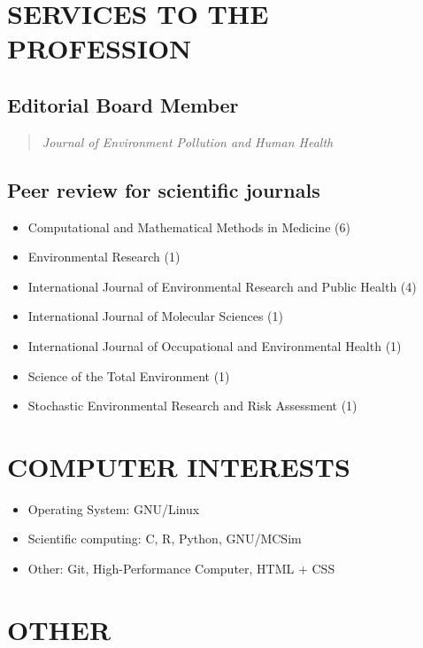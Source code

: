 \documentclass[10pt,]{article}
\providecommand{\tightlist}{%
  \setlength{\itemsep}{0pt}\setlength{\parskip}{0pt}}
\begin{document}
\section{SERVICES TO THE PROFESSION}\label{services-to-the-profession}

\subsection{Editorial Board Member}\label{editorial-board-member}

\begin{quote}
\emph{Journal of Environment Pollution and Human Health}
\end{quote}

\subsection{Peer review for scientific
journals}\label{peer-review-for-scientific-journals}

\begin{itemize}
\tightlist
\item
  Computational and Mathematical Methods in Medicine (6)
\item
  Environmental Research (1)
\item
  International Journal of Environmental Research and Public Health (4)
\item
  International Journal of Molecular Sciences (1)
\item
  International Journal of Occupational and Environmental Health (1)
\item
  Science of the Total Environment (1)
\item
  Stochastic Environmental Research and Risk Assessment (1)
\end{itemize}

\section{COMPUTER INTERESTS}\label{computer-interests}

\begin{itemize}
\tightlist
\item
  Operating System: GNU/Linux
\item
  Scientific computing: C, R, Python, GNU/MCSim
\item
  Other: Git, High-Performance Computer, HTML + CSS
\end{itemize}

\section{OTHER}\label{other}
\end{document}
